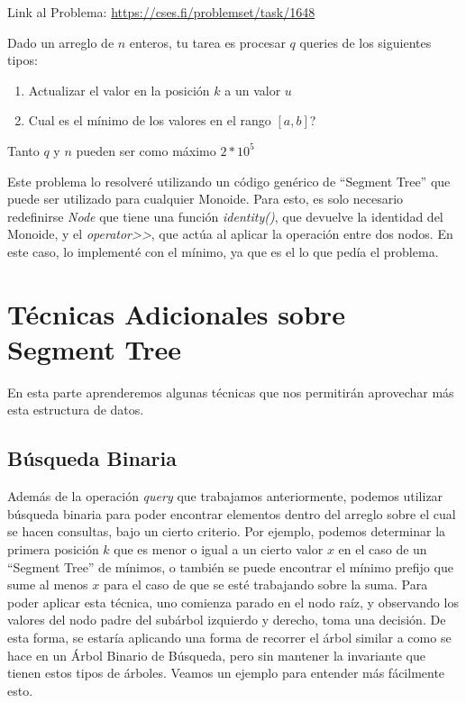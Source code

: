 \documentclass{article}
\begin{document}
Link al Problema: \href{https://cses.fi/problemset/task/1648}{https://cses.fi/problemset/task/1648}

\begin{tcolorbox}
Dado un arreglo de $n$ enteros, tu tarea es procesar $q$ queries de los siguientes tipos:
\begin{enumerate}
    \item Actualizar el valor en la posición $k$ a un valor $u$
    \item Cual es el mínimo de los valores en el rango $[a,b]$?
\end{enumerate}
Tanto $q$ y $n$ pueden ser como máximo $2*10^5$
\end{tcolorbox}

Este problema lo resolveré utilizando un código genérico de ``Segment Tree'' que puede ser utilizado para cualquier Monoide. Para esto, es solo necesario redefinirse \textit{Node} que tiene una función \textit{identity()}, que devuelve la identidad del Monoide, y el \textit{operator>{}>}, que actúa al aplicar la operación entre dos nodos. En este caso, lo implementé con el mínimo, ya que es el lo que pedía el problema.


\section{Técnicas Adicionales sobre Segment Tree}

En esta parte aprenderemos algunas técnicas que nos permitirán aprovechar más esta estructura de datos.

\subsection{Búsqueda Binaria}

Además de la operación \textit{query} que trabajamos anteriormente, podemos utilizar búsqueda binaria para poder encontrar elementos dentro del arreglo sobre el cual se hacen consultas, bajo un cierto criterio. Por ejemplo, podemos determinar la primera posición $k$ que es menor o igual a un cierto valor $x$ en el caso de un ``Segment Tree'' de mínimos, o también se puede encontrar el mínimo prefijo que sume al menos $x$ para el caso de que se esté trabajando sobre la suma. Para poder aplicar esta técnica, uno comienza parado en el nodo raíz, y observando los valores del nodo padre del subárbol izquierdo y derecho, toma una decisión. De esta forma, se estaría aplicando una forma de recorrer el árbol similar a como se hace en un Árbol Binario de Búsqueda, pero sin mantener la invariante que tienen estos tipos de árboles. Veamos un ejemplo para entender más fácilmente esto.
\end{document}
